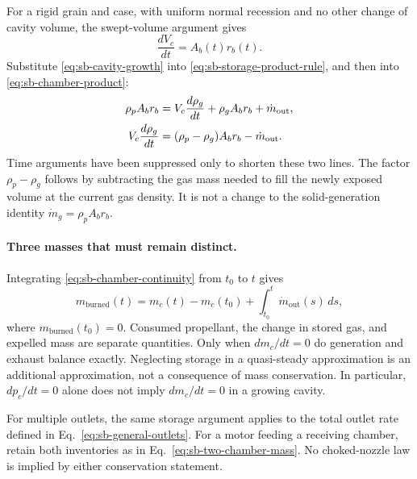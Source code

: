 For a rigid grain and case, with uniform normal recession and no other
change of cavity volume, the swept-volume argument gives
\begin{equation}\label{eq:sb-cavity-growth}
 \frac{dV_c}{dt}=A_b(t)r_b(t).
\end{equation}
Substitute \eqref{eq:sb-cavity-growth} into
\eqref{eq:sb-storage-product-rule}, and then into
\eqref{eq:sb-chamber-product}:
\begin{align}
 \rho_p A_b r_b
 &=V_c\frac{d\rho_g}{dt}+\rho_g A_b r_b+\dot m_{\mathrm{out}},\notag\\
 V_c\frac{d\rho_g}{dt}
 &=(\rho_p-\rho_g)A_b r_b-\dot m_{\mathrm{out}}.
 \label{eq:sb-expanded-mass}
\end{align}
Time arguments have been suppressed only to shorten these two lines.
The factor $\rho_p-\rho_g$ follows by subtracting the gas mass needed
to fill the newly exposed volume at the current gas density. It is
not a change to the solid-generation identity $\dot m_g
=\rho_p A_b r_b$.

\paragraph{Three masses that must remain distinct.}
Integrating \eqref{eq:sb-chamber-continuity} from $t_0$ to $t$ gives
\begin{equation}\label{eq:sb-integrated-chamber-mass}
 m_{\mathrm{burned}}(t)
 =m_c(t)-m_c(t_0)+\int_{t_0}^{t}\dot m_{\mathrm{out}}(s)\,ds,
\end{equation}
where $m_{\mathrm{burned}}(t_0)=0$. Consumed propellant, the change in
stored gas, and expelled mass are separate quantities.
Only when $dm_c/dt=0$ do generation and exhaust balance exactly.
Neglecting storage in a quasi-steady approximation is an additional
approximation, not a consequence of mass conservation. In particular,
$dp_c/dt=0$ alone does not imply $dm_c/dt=0$ in a growing cavity.

For multiple outlets, the same storage argument applies to the total
outlet rate defined in Eq.~\eqref{eq:sb-general-outlets}. For a motor
feeding a receiving chamber, retain both inventories as in
Eq.~\eqref{eq:sb-two-chamber-mass}. No choked-nozzle law is implied
by either conservation statement.


